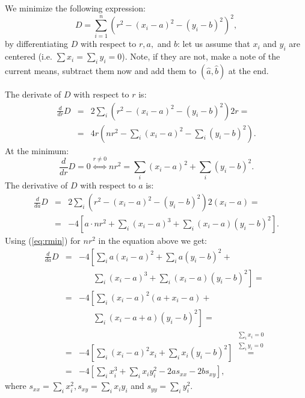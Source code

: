 \documentclass[aoas]{imsart}\usepackage[]{graphicx}\usepackage[]{color}
\begin{document}
We minimize the following expression:
\begin{equation}\label{eq:circle}
D = \sum_{i=1}^n \left( r^2 - (x_i-a)^2 - (y_i-b)^2 \right)^2,
\end{equation}
by differentiating $D$ with respect to $r, a,$ and $b$:
let us assume that $x_i$ and $y_i$ are centered (i.e. $\sum x_i = \sum_i y_i = 0$). Note, if they are not, make a note of the current means, subtract them now and add them to $(\hat{a}, \hat{b})$ at the end. 

\noindent
The  derivate of $D$ with respect to $r$ is:
\begin{eqnarray*}
\frac{d}{dr} D &=& 2 \sum_i \left( r^2 - (x_i-a)^2 - (y_i-b)^2 \right) 2 r = \\
&=& 4 r \left( n r^2 - \sum_i (x_i-a)^2 - \sum_i(y_i-b)^2 \right).
\end{eqnarray*}
At the minimum:
\begin{equation}\label{eq:rmin}
\frac{d}{dr} D = 0 \stackrel{r \neq 0}{\iff} nr^2  = \sum_i (x_i-a)^2 + \sum_i(y_i-b)^2.
\end{equation}
%
%
The  derivative of $D$ with respect to $a$ is:
\begin{eqnarray*}
\frac{d}{da} D &=& 2 \sum_i \left( r^2 - (x_i-a)^2 - (y_i-b)^2 \right) 2 (x_i - a) = \\
&=& -4 \left[ a \cdot nr^2 + \sum_i (x_i - a)^3  + \sum_i (x_i - a) (y_i - b)^2 \right].
\end{eqnarray*}
Using (\ref{eq:rmin}) for $nr^2$  in the equation above we get:
\begin{eqnarray*}
\frac{d}{da} D &=& -4 \left[  \sum_i a(x_i-a)^2 +  \sum_i a(y_i-b)^2  + \right. \\
&& \phantom{-4 \ \ } \left . \sum_i (x_i - a)^3  + \sum_i (x_i - a) (y_i - b)^2 \right]  = \\
&=& -4 \left[ \sum_i (x_i-a)^2 (a + x_i - a)  + \right.\\
&& \phantom{-4 \ \ } \left .\sum_i (x_i - a + a) (y_i - b)^2 \right] = \\
&=& -4 \left[ \sum_i (x_i-a)^2 x_i   + \sum_i x_i  (y_i - b)^2 \right] 
\stackrel{\begin{array}{c}\sum_i x_i = 0\\
\sum_i y_i = 0\end{array}}{=} \\
&=& -4 \left[ \sum_i x_i^3   + \sum_i x_i y_i^2  - 2a s_{xx} - 2b s_{xy} \right],
\end{eqnarray*}
where $s_{xx} = \sum_i x_i^2, s_{xy} = \sum_i x_i y_i$ and $s_{yy} = \sum_i y_i^2$.
\end{document}
